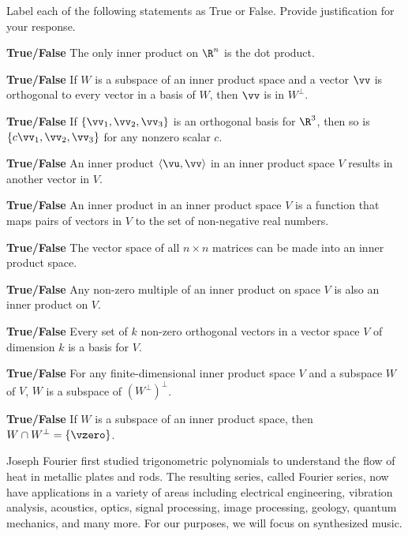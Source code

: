 \item Label each of the following statements as True or False. Provide justification for your response.
	\ba
	\item \textbf{True/False} The only inner product on $\R^n$ is the dot product.
	\item \textbf{True/False} If $W$ is a subspace of an inner product space and a vector $\vv$ is orthogonal to every vector in a basis of $W$, then $\vv$ is in $W^{\perp}$.
	\item \textbf{True/False} If $\{\vv_1, \vv_2, \vv_3\}$ is an orthogonal basis for $\R^3$, then so is $\{c\vv_1, \vv_2, \vv_3\}$ for any nonzero scalar $c$. 
	\item \textbf{True/False} An inner product $\langle \vu, \vv \rangle$ in an inner product space $V$ results in another vector in $V$.
	\item \textbf{True/False} An inner product in an inner product space $V$ is a function that maps pairs of vectors in $V$ to the set of non-negative real numbers. 
	\item \textbf{True/False} The vector space of all $n \times n$ matrices can be made into an inner product space.  
	\item \textbf{True/False} Any non-zero multiple of an inner product on space $V$ is also an inner product on $V$.
  \item \textbf{True/False} Every set of $k$ non-zero orthogonal vectors in a vector space $V$ of dimension $k$ is a basis for $V$. 
	\item \textbf{True/False} For any finite-dimensional inner product space $V$ and a subspace $W$ of $V$, $W$ is a subspace of $(W^\perp)^\perp$.
	\item \textbf{True/False} If $W$ is a subspace of an inner product space, then $W\cap W^\perp = \{\vzero\}$.
	\ea    
	  

\ee


Joseph Fourier first studied trigonometric polynomials to understand the flow of heat in metallic plates and rods. The resulting series, called Fourier series, now have applications in a variety of areas including  electrical engineering, vibration  analysis, acoustics, optics, signal processing, image processing, geology, quantum mechanics, and many more. For our purposes, we will focus on synthesized music.


